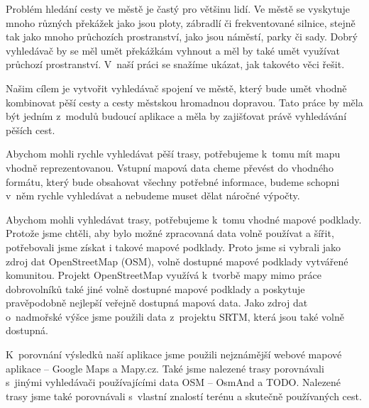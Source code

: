 
Problém hledání cesty ve městě je častý pro většinu lidí. Ve městě se vyskytuje
mnoho různých překážek jako jsou ploty, zábradlí či frekventované silnice,
stejně tak jako mnoho průchozích prostranství, jako jsou náměstí, parky či sady.
Dobrý vyhledávač by se měl umět překážkám vyhnout a měl by také umět využívat
průchozí prostranství. V~naší práci se snažíme ukázat, jak takovéto věci řešit.

Našim cílem je vytvořit vyhledávač spojení ve městě, který bude umět vhodně
kombinovat pěší cesty a cesty městskou hromadnou dopravou. Tato práce by měla
být jedním z~modulů budoucí aplikace a měla by zajišťovat právě vyhledávání
pěších cest.

Abychom mohli rychle vyhledávat pěší trasy, potřebujeme k~tomu mít mapu vhodně
reprezentovanou. Vstupní mapová data cheme převést do vhodného formátu, který
bude obsahovat všechny potřebné informace, budeme schopni v~něm rychle
vyhledávat a nebudeme muset dělat náročné výpočty. 

Abychom mohli vyhledávat trasy, potřebujeme k~tomu vhodné mapové podklady.
Protože jsme chtěli, aby bylo možné zpracovaná data volně používat a šířit, 
potřebovali jsme získat i takové mapové podklady. Proto jsme si vybrali jako
zdroj dat OpenStreetMap (OSM), volně dostupné mapové podklady vytvářené komunitou. 
Projekt OpenStreetMap využívá k~tvorbě mapy mimo práce dobrovolníků také jiné
volně dostupné mapové podklady a poskytuje pravěpodobně nejlepší veřejně
dostupná mapová data. Jako zdroj dat o~nadmořské výšce jsme použili data
z~projektu SRTM, která jsou také volně dostupná.

K~porovnání výsledků naší aplikace jsme použili nejznámější webové mapové
aplikace -- Google Maps a Mapy.cz. Také jsme nalezené trasy porovnávali s~jinými
vyhledávači používajícími data OSM -- OsmAnd a TODO. Nalezené trasy jsme také
porovnávali s~vlastní znalostí terénu a skutečně používaných cest.

